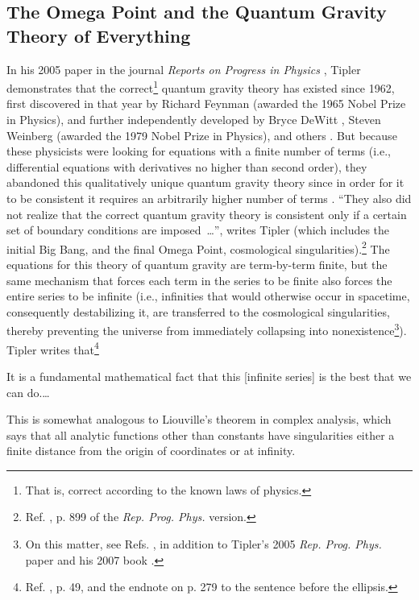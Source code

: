 \documentclass[letterpaper,12pt]{article}
\newenvironment{squotation}
  {\small\quotation}
  {\endquotation\normalsize}
\begin{document}
\subsection{The Omega Point and the Quantum Gravity Theory of Everything}
\label{subsec:OPQuantumGravityTOE}

In his 2005 paper in the journal \emph{Reports on Progress in Physics} \cite{Tipler2005}, Tipler demonstrates that the correct\footnote{That is, correct according to the known laws of physics.} quantum gravity theory has existed since 1962, first discovered in that year by Richard Feynman \cite{Feynman1963,Feynman1995,Feynman1972a,Feynman1972b} (awarded the 1965 Nobel Prize in Physics), and further independently developed by Bryce DeWitt \cite{DeWitt1967-8,DeWitt1967-10a,DeWitt1967-10b,DeWitt1968}, Steven Weinberg \cite{Weinberg1979} (awarded the 1979 Nobel Prize in Physics), and others \cite{FaddeevPopov1967,Mandelstam1968a,Mandelstam1968b,FradkinTyutin1970}. But because these physicists were looking for equations with a finite number of terms (i.e., differential equations with derivatives no higher than second order), they abandoned this qualitatively unique quantum gravity theory since in order for it to be consistent it requires an arbitrarily higher number of terms \cite{Tipler2007}. ``They also did not realize that the correct quantum gravity theory is consistent only if a certain set of boundary conditions are imposed~\ldots'', writes Tipler (which includes the initial Big Bang, and the final Omega Point, cosmological singularities).\footnote{Ref. , p. 899 of the \emph{Rep. Prog. Phys.} version.} The equations for this theory of quantum gravity are term-by-term finite, but the same mechanism that forces each term in the series to be finite also forces the entire series to be infinite (i.e., infinities that would otherwise occur in spacetime, consequently destabilizing it, are transferred to the cosmological singularities, thereby preventing the universe from immediately collapsing into nonexistence\footnote{On this matter, see Refs. , in addition to Tipler's 2005 \emph{Rep. Prog. Phys.} paper \cite{Tipler2005} and his 2007 book \cite{Tipler2007}.}). Tipler writes that\footnote{Ref. , p. 49, and the endnote on p. 279 to the sentence before the ellipsis.}

\begin{squotation}
It is a fundamental mathematical fact that this [infinite series] is the best that we can do.\thinspace\ldots

This is somewhat analogous to Liouville's theorem in complex analysis, which says that all analytic functions other than constants have singularities either a finite distance from the origin of coordinates or at infinity.
\end{squotation}
\end{document}
